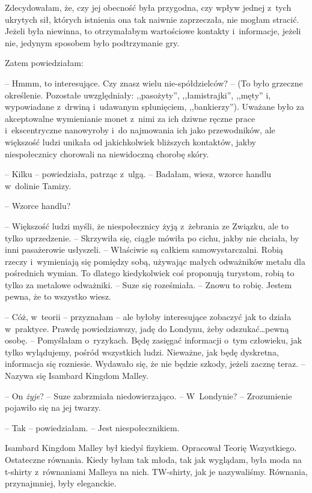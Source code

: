 \documentclass[oneside,polish,11pt,sfheadings]{mwbk}
\begin{document}
Zdecydowałam, że, czy jej obecność była przygodna, czy wpływ jednej z~tych ukrytych sił, których istnienia ona tak naiwnie zaprzeczała, nie
mogłam stracić. Jeżeli była niewinna, to otrzymałabym wartościowe
kontakty i~informacje, jeżeli nie, jedynym sposobem było podtrzymanie
gry.

Zatem powiedziałam: 

-- Hmmm, to interesujące. Czy znasz wielu
nie-spółdzielców? -- (To było grzeczne określenie. Pozostałe
uwzględniały: ,,pasożyty'', ,,łamistrajki'', ,,męty'' i, wypowiadane z~drwiną i~udawanym splunięciem, ,,bankierzy''). Uważane było za
akceptowalne wymienianie monet z~nimi za ich dziwne ręczne prace i~ekscentryczne nanowyroby i~do najmowania ich jako przewodników, ale
większość ludzi unikała od jakichkolwiek bliższych kontaktów, jakby
niespołecznicy chorowali na niewidoczną chorobę skóry.

-- Kilku -- powiedziała, patrząc z~ulgą. -- Badałam, wiesz, wzorce handlu w~dolinie Tamizy.

-- Wzorce handlu?

-- Większość ludzi myśli, że niespołecznicy żyją z~żebrania ze Związku,
ale to tylko uprzedzenie. -- Skrzywiła się, ciągle mówiła po cichu, jakby
nie chciała, by inni pasażerowie usłyszeli. -- Właściwie są całkiem
samowystarczalni. Robią rzeczy i~wymieniają się pomiędzy sobą, używając
małych odważników metalu dla pośrednich wymian. To dlatego kiedykolwiek
coś proponują turystom, robią to tylko za metalowe odważniki. -- Suze się
roześmiała. -- Znowu to robię. Jestem pewna, że to wszystko wiesz.

-- Cóż, w~teorii -- przyznałam -- ale byłoby interesujące zobaczyć jak to
działa w~praktyce. Prawdę powiedziawszy, jadę do Londynu, żeby
odszukać\ldots  pewną osobę. -- Pomyślałam o~ryzykach. Będę zasięgać
informacji o~tym człowieku, jak tylko wylądujemy, pośród wszystkich
ludzi. Nieważne, jak będę dyskretna, informacja się rozniesie. Wydawało
się, że nie będzie szkody, jeżeli zacznę teraz. -- Nazywa się Isambard
Kingdom Malley.

-- On \textit{żyje}? -- Suze zabrzmiała niedowierzająco. -- W~Londynie? -- Zrozumienie pojawiło się na jej twarzy.

-- Tak -- powiedziałam. -- Jest niespołecznikiem.

Isambard Kingdom Malley był kiedyś fizykiem. Opracował Teorię
Wszystkiego. Ostateczne równania. Kiedy byłam tak młoda, tak jak
wyglądam, była moda na t-shirty z~równaniami Malleya na nich. TW-shirty,
jak je nazywaliśmy. Równania, przynajmniej, były eleganckie.
\end{document}
